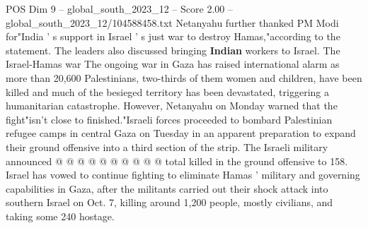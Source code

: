 \begin{textsample}{POS Dim 9 – global\_south\_2023\_12 – Score 2.00 – global\_south\_2023\_12/104588458.txt}
Netanyahu further thanked PM Modi for"India ' s support in Israel ' s just war to destroy Hamas,"according to the statement.
The leaders also discussed bringing \textbf{Indian} workers to Israel.
The Israel-Hamas war The ongoing war in Gaza has raised international alarm as more than 20,600 Palestinians, two-thirds of them women and children, have been killed and much of the besieged territory has been devastated, triggering a humanitarian catastrophe.
However, Netanyahu on Monday warned that the fight"isn't close to finished."Israeli forces proceeded to bombard Palestinian refugee camps in central Gaza on Tuesday in an apparent preparation to expand their ground offensive into a third section of the strip.
The Israeli military announced @ @ @ @ @ @ @ @ @ @ total killed in the ground offensive to 158.
Israel has vowed to continue fighting to eliminate Hamas ' military and governing capabilities in Gaza, after the militants carried out their shock attack into southern Israel on Oct. 7, killing around 1,200 people, mostly civilians, and taking some 240 hostage.

\end{textsample}
